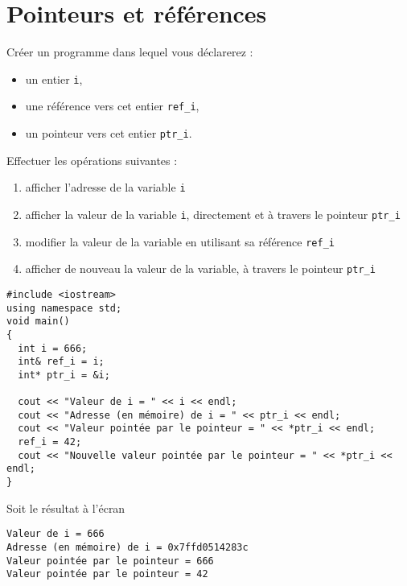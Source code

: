 \documentclass{book}
\begin{document}

\section{Pointeurs et références}

Créer un programme dans lequel vous déclarerez :

\begin{itemize}
\item un entier \texttt{i},
\item une référence vers cet entier \texttt{ref\_i},
\item un pointeur vers cet entier \texttt{ptr\_i}.
\end{itemize}

\vspace{1em}
Effectuer les opérations suivantes :

\begin{enumerate}
  \item afficher l'adresse de la variable \texttt{i}
  \item afficher la valeur de la variable \texttt{i}, directement et à travers le pointeur \texttt{ptr\_i}
  \item modifier la valeur de la variable en utilisant sa référence \texttt{ref\_i}
  \item afficher de nouveau la valeur de la variable, à travers le pointeur \texttt{ptr\_i}
\end{enumerate}

\begin{correction}

\begin{verbatim}
#include <iostream>
using namespace std;
void main()
{
  int i = 666;
  int& ref_i = i;
  int* ptr_i = &i;

  cout << "Valeur de i = " << i << endl;
  cout << "Adresse (en mémoire) de i = " << ptr_i << endl;
  cout << "Valeur pointée par le pointeur = " << *ptr_i << endl;
  ref_i = 42;
  cout << "Nouvelle valeur pointée par le pointeur = " << *ptr_i << endl;
}
\end{verbatim}

Soit le résultat à l'écran

\begin{verbatim}
Valeur de i = 666
Adresse (en mémoire) de i = 0x7ffd0514283c
Valeur pointée par le pointeur = 666
Valeur pointée par le pointeur = 42
\end{verbatim}
\end{correction}
\end{document}
